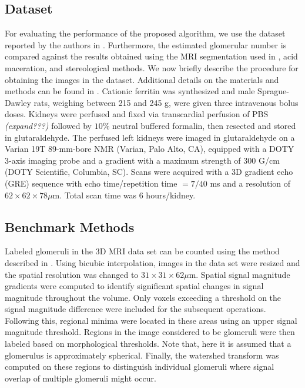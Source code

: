 \subsection{Dataset}
\label{sec:dataset}
For evaluating the performance of the proposed algorithm, we use the dataset reported by the authors in \cite{beeman2011measuring}. Furthermore, the estimated glomerular number is compared against the results obtained using the MRI segmentation used in \cite{beeman2011measuring}, acid maceration, and stereological methods. We now briefly describe the procedure for obtaining the images in the dataset. Additional details on the materials and methods can be found in \cite{beeman2011measuring}. Cationic ferritin was synthesized and male Sprague-Dawley rats, weighing between 215 and 245 g, were given three intravenous bolus doses. Kidneys were perfused and fixed via transcardial perfusion of PBS \textit{(expand???)} followed by $10\%$ neutral buffered formalin, then resected and stored in glutaraldehyde. The perfused left kidneys were imaged in glutaraldehyde on a Varian 19T 89-mm-bore NMR (Varian, Palo Alto, CA), equipped with a DOTY 3-axis imaging probe and a gradient with a maximum strength of 300 G/cm (DOTY Scientific, Columbia, SC). Scans were acquired with a 3D gradient echo (GRE) sequence with echo time/repetition time $= 7/40$ ms and a resolution of $62 \times 62 \times 78 \mu$m. Total scan time was 6 hours/kidney.

\subsection{Benchmark Methods}
\label{sec:benchmark}
Labeled glomeruli in the 3D MRI data set can be counted using the method described in \cite{beeman2011measuring}. Using bicubic interpolation, images in the data set were resized and the spatial resolution was changed to $31 \times 31 \times 62 \mu$m. Spatial signal magnitude gradients were computed to identify significant spatial changes in signal magnitude throughout the volume. Only voxels exceeding a threshold on the signal magnitude difference were included for the subsequent operations. Following this, regional minima were located in these areas using an upper signal magnitude threshold. Regions in the image considered to be glomeruli were then labeled based on morphological thresholds. Note that, here it is assumed that a glomerulus is approximately spherical. Finally, the watershed transform \cite{} was computed on these regions to distinguish individual glomeruli where signal overlap of multiple glomeruli might occur.

